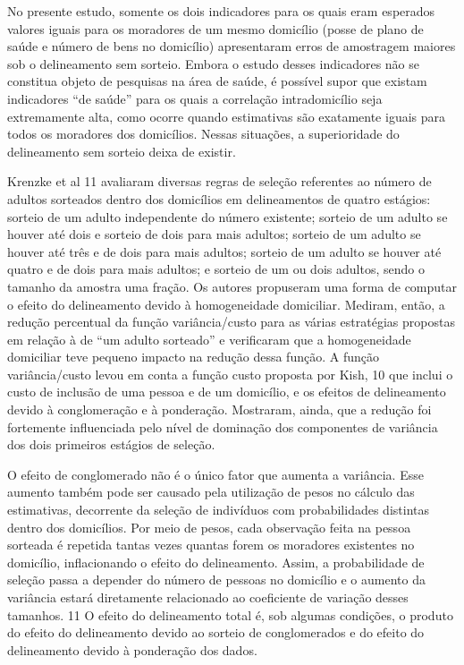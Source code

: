 \documentclass{article}
\begin{document}

No presente estudo, somente os dois indicadores para os quais eram esperados valores iguais para os moradores de um mesmo domicílio (posse de plano de saúde e número de bens no domicílio) apresentaram erros de amostragem maiores sob o delineamento sem sorteio. Embora o estudo desses indicadores não se constitua objeto de pesquisas na área de saúde, é possível supor que existam indicadores “de saúde” para os quais a correlação intradomicílio seja extremamente alta, como ocorre quando estimativas são exatamente iguais para todos os moradores dos domicílios. Nessas situações, a superioridade do delineamento sem sorteio deixa de existir.

Krenzke et al%
11%
 avaliaram diversas regras de seleção referentes ao número de adultos sorteados dentro dos domicílios em delineamentos de quatro estágios: sorteio de um adulto independente do número existente; sorteio de um adulto se houver até dois e sorteio de dois para mais adultos; sorteio de um adulto se houver até três e de dois para mais adultos; sorteio de um adulto se houver até quatro e de dois para mais adultos; e sorteio de um ou dois adultos, sendo o tamanho da amostra uma fração. Os autores propuseram uma forma de computar o efeito do delineamento devido à homogeneidade domiciliar. Mediram, então, a redução percentual da função variância/custo para as várias estratégias propostas em relação à de “um adulto sorteado” e verificaram que a homogeneidade domiciliar teve pequeno impacto na redução dessa função. A função variância/custo levou em conta a função custo proposta por Kish,%
10%
 que inclui o custo de inclusão de uma pessoa e de um domicílio, e os efeitos de delineamento devido à conglomeração e à ponderação. Mostraram, ainda, que a redução foi fortemente influenciada pelo nível de dominação dos componentes de variância dos dois primeiros estágios de seleção.

O efeito de conglomerado não é o único fator que aumenta a variância. Esse aumento também pode ser causado pela utilização de pesos no cálculo das estimativas, decorrente da seleção de indivíduos com probabilidades distintas dentro dos domicílios. Por meio de pesos, cada observação feita na pessoa sorteada é repetida tantas vezes quantas forem os moradores existentes no domicílio, inflacionando o efeito do delineamento. Assim, a probabilidade de seleção passa a depender do número de pessoas no domicílio e o aumento da variância estará diretamente relacionado ao coeficiente de variação desses tamanhos.%
11%
 O efeito do delineamento total é, sob algumas condições, o produto do efeito do delineamento devido ao sorteio de conglomerados e do efeito do delineamento devido à ponderação dos dados.
\end{document}
